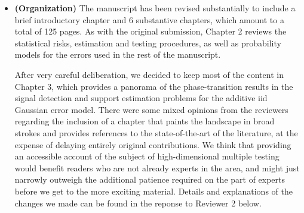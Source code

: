 \documentclass[11pt]{article}
\begin{document}
\begin{itemize}
%   
%   
%    
  
 
  \item {\bf (Organization)} 
  The manuscript has been revised substantially to include a brief introductory chapter and 6 substantive chapters, which amount to a total of 125 pages.
  As with the original submission, Chapter 2 reviews the statistical risks, estimation and testing procedures, as well as probability models for the errors used in the rest of the manuscript. 
  
  After very careful deliberation, we decided to keep most of the content in Chapter 3, which provides a panorama of the phase-transition results in the signal detection and support estimation problems for the additive iid Gaussian error model.
  There were some mixed opinions from the reviewers regarding the inclusion of a chapter that paints the landscape in broad strokes and provides references to the state-of-the-art of the literature, at the expense of delaying entirely original contributions.
  We think that providing an accessible account of the subject of high-dimensional multiple testing would benefit readers who are not already experts in the area, and might just narrowly outweigh the additional patience required on the part of experts before we get to the more exciting material.
  Details and explanations of the changes we made can be found in the reponse to Reviewer 2 below.
  

\end{itemize}
\end{document}
